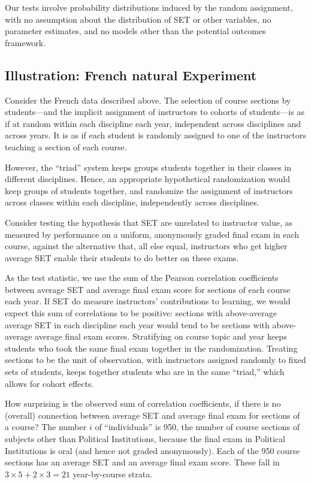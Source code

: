 \documentclass[12pt]{article}
\begin{document}
Our tests involve probability distributions induced by the random
assignment, with no assumption about the distribution of SET or other variables, 
no parameter estimates, and no models other than the potential outcomes 
framework.

\subsection{Illustration: French natural Experiment}
Consider the French data described above. 
The selection of course sections by students---and the implicit assignment of instructors to cohorts of students---is as if at random within each
discipline each year, independent across disciplines and across years.
It is as if each student is randomly assigned to one of the instructors teaching a section of each
course.

However, the ``triad'' system keeps groups students together in their classes in different disciplines.
Hence, an appropriate hypothetical randomization would keep groups of students
together, and randomize the assignment of instructors across classes within
each discipline, independently across disciplines.

Consider testing the hypothesis that SET are unrelated to instructor value, as 
measured by performance on a uniform, anonymously graded final exam in each course,
against the alternative that, all else equal, instructors who get higher average SET
enable their students to do better on these exams.

As the test statistic, we use the sum of the Pearson correlation coefficients between
average SET and average final exam score for sections of each course each year.
If SET do measure instructors' contributions to learning, we would expect this sum of
correlations to be positive: sections with above-average average SET in each discipline each year
would tend to be sections with above-average average final exam scores.
Stratifying on course topic and year keeps students who took the same final
exam together in the randomization.
Treating sections to be the unit of observation, with instructors assigned randomly to
fixed sets of students, keeps together students who are in the same ``triad,'' which
allows for cohort effects. 


How surprising is the observed sum of correlation coefficients, if there is no (overall) 
connection between
average SET and average final exam for sections of a course?
The number $i$ of ``individuals'' is 950, the number of course sections of subjects other
than Political Institutions, because the final exam in Political Institutions is oral (and hence not
graded anonymously).
Each of the 950 course sections has an average SET and an average final exam score.
These fall in $3\times5 + 2 \times 3 = 21$ year-by-course strata.
 
\end{document}
